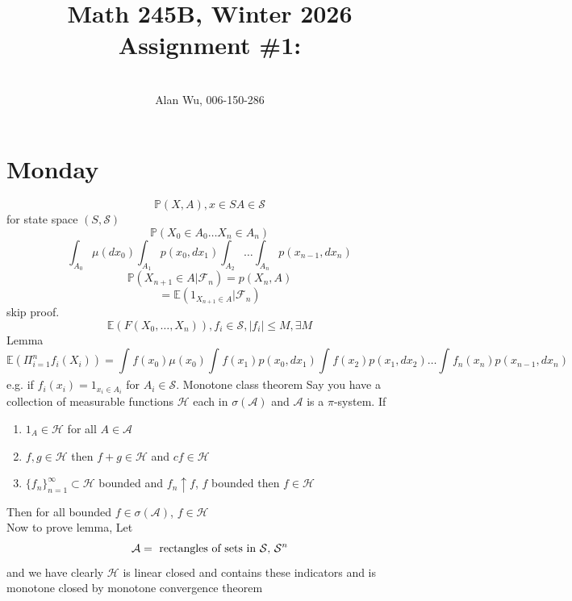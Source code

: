 \documentclass[11pt]{article}
\newcommand{\cnum}{Math 245B}
\newcommand{\ced}{Winter 2026}
\newcommand{\ctitle}[4]{\title{\vspace{-0.5in}\cnum, \ced\\Assignment #1: #2}\author{\vspace{-0.35in}\\#3, #4}}
\begin{document}
\ctitle{\#1}{}{Alan Wu}{006-150-286}
\date{}
\maketitle

\section{Monday}
\[
    \mathbb{P}(X,A) , x \in S A \in \mathcal{S}
\] 
for state space $(S, \mathcal{S})$
\[
\mathbb{P}(X_0 \in A_0 \dots X_n \in A_n)
\] 
\[
    \int_{A_0}^{}\mu(dx_0) \int_{A_1}^{}p(x_0,dx_1) \int_{A_2}^{}\dots \int_{A_n}^{}p(x_{n-1}, dx_n)
\] 
\[
    \mathbb{P}(X_{n+1} \in A | \mathcal{F}_n) = p(X_n, A)
\] 
\[
    = \mathbb{E}(1_{X_{n+1} \in A} | \mathcal{F}_n)
\] 
skip proof.
\[
    \mathbb{E}(F(X_0,\dots,X_n)), f_i \in \mathcal{S}, |f_i| \le M, \exists M
\] 
Lemma
\[
    \mathbb{E}( \Pi_{i=1}^{n}f_i(X_i)) = \int_{}^{}f(x_0) \mu(x_0) \int_{}^{}f(x_1) p(x_0,dx_1) \int_{}^{}f(x_2) p(x_1,dx_2) \dots \int_{}^{}f_n(x_n) p(x_{n-1},dx_n)
\] 
e.g. if $f_i(x_i) = 1_{x_i \in A_i}$ for  $A_i \in \mathcal{S}$.
Monotone class theorem
Say you have a collection of measurable functions  $\mathcal{H}$ each in $\sigma( \mathcal{A})$ 
and $  \mathcal{A}$ is a $ \pi$-system. If
\begin{enumerate}
    \item $1_A \in \mathcal{H}$ for all $A \in \mathcal{A}$
    \item $f,g \in \mathcal{H}$ then $f+g \in \mathcal{H}$ and $c f \in \mathcal{H}$ 
    \item $\{f_n\}_{n=1}^{\infty} \subset \mathcal{H}$ bounded and 
        $f_n \uparrow f$, $f$ bounded then $f \in \mathcal{H}$
\end{enumerate}
Then for all bounded $f \in \sigma( \mathcal{A})$, $f \in \mathcal{H}$\\
Now to prove lemma, Let
 \[
     \mathcal{A} = \text{ rectangles of sets in $ \mathcal{S}$, $\mathcal{S}^{n}$}
\] 
and we have clearly $\mathcal{H}$ is linear closed and contains these indicators and is monotone closed by monotone convergence theorem 
\end{document}

